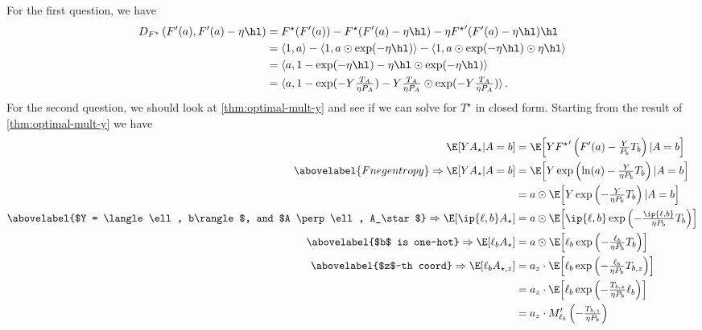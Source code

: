 For the first question, we have
\begin{align}
    D_{F^\star}\left(F'(a), F'(a) - \eta \hl\right)
     & =
    F^\star(F'(a)) - F^\star(F'(a) - \eta \hl)
    - \eta {F^\star}'(F'(a) - \eta \hl) \hl
    \nonumber
    \\
     & =
    \langle 1, a\rangle -
    \langle 1, a \odot \exp(-\eta \hl)\rangle
    -
    \langle 1, a \odot \exp(-\eta \hl) \odot \eta \hl\rangle
    \nonumber
    \\
     & =
    \langle a,
    1
    - \exp(-\eta \hl)
    - \eta \hl \odot \exp(-\eta \hl)
    \rangle
    \label{eq:linearized-D_F}
    \\
     & =
    \langle a,
    1
    - \exp(-Y \tfrac{T_A}{\eta P_A})
    - Y \tfrac{T_A}{\eta P_A} \odot \exp(-Y \tfrac{T_A}{\eta P_A})
    \rangle\,.\nonumber
\end{align}
For the second question, we should look at \cref{thm:optimal-mult-y} and
see if we can solve for $T^\star$ in closed form.
Starting from the result of \cref{thm:optimal-mult-y} we have
\begin{align*}
    \E\!\left[
        Y A_\star
        | A = b
        \right]
     & =
    \E\!\left[
        Y {F^\star}'\left(F'(a) - \tfrac{Y}{P_b}T_b\right)
        | A = b
    \right] \nonumber \\
    \abovelabel{F negentropy}
    \Rightarrow
    \E\!\left[
        Y A_\star
        | A = b
        \right]
     & =
    \E\!\left[
        Y \exp\left(\ln(a) - \tfrac{Y}{\eta P_b}T_b\right)
        | A = b
    \right] \nonumber \\
     & =
    a \odot
    \E\!\left[
        Y \exp\left(- \tfrac{Y}{\eta P_b}T_b\right)
        | A = b
    \right] \nonumber \\
    \abovelabel{$Y = \langle \ell, b\rangle$, and $A \perp \ell, A_\star$}
    \Rightarrow
    \E\!\left[
        \ip{\ell, b} A_\star
        \right]
     & =
    a \odot
    \E\!\left[
        \ip{\ell, b} \exp\left(- \tfrac{\ip{\ell, b}}{\eta P_b}T_b\right)
        \right]
    \\
    \abovelabel{$b$ is one-hot}
    \Rightarrow
    \E\!\left[
        \ell_b A_\star
        \right]
     & =
    a \odot
    \E\!\left[
        \ell_b \exp\left(- \tfrac{\ell_b}{\eta P_b}T_b\right)
        \right]
    \\
    \abovelabel{$z$-th coord}
    \Rightarrow
    \E\!\left[
        \ell_b A_{\star, z}
        \right]
     & =
    a_z \cdot
    \E\!\left[
        \ell_b \exp\left(- \tfrac{\ell_b}{\eta P_b}T_{b, z}\right)
        \right]
    \\
     & =
    a_z \cdot
    \E\!\left[
        \ell_b
        \exp\left(- \tfrac{T_{b, z}}{\eta P_b}\ell_b\right)
        \right]
    \\
     & =
    a_z \cdot
    M_{\ell_{b}}'\left(- \tfrac{T_{b, z}}{\eta P_b}\right)
\end{align*}
